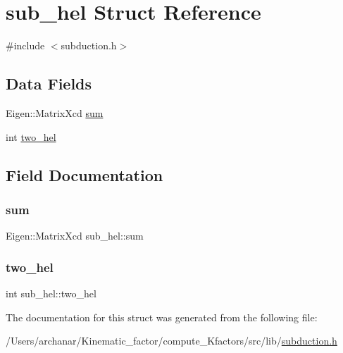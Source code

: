 \hypertarget{structsub__hel}{}\section{sub\+\_\+hel Struct Reference}
\label{structsub__hel}


{\ttfamily \#include $<$subduction.\+h$>$}

\subsection*{Data Fields}
\begin{DoxyCompactItemize}
\item 
Eigen\+::\+Matrix\+Xcd \mbox{\hyperlink{structsub__hel_ab9af10158d0adb4843c85bdf9b7517f7}{sum}}
\item 
int \mbox{\hyperlink{structsub__hel_a5169b026327848aac58eb2eec0f0cbb1}{two\+\_\+hel}}
\end{DoxyCompactItemize}


\subsection{Field Documentation}
\mbox{\label{structsub__hel_ab9af10158d0adb4843c85bdf9b7517f7}} 
\subsubsection{\texorpdfstring{sum}{sum}}
{\footnotesize\ttfamily Eigen\+::\+Matrix\+Xcd sub\+\_\+hel\+::sum}

\mbox{\label{structsub__hel_a5169b026327848aac58eb2eec0f0cbb1}} 
\subsubsection{\texorpdfstring{two\_hel}{two\_hel}}
{\footnotesize\ttfamily int sub\+\_\+hel\+::two\+\_\+hel}



The documentation for this struct was generated from the following file\+:\begin{DoxyCompactItemize}
\item 
/\+Users/archanar/\+Kinematic\+\_\+factor/compute\+\_\+\+Kfactors/src/lib/\mbox{\hyperlink{src_2lib_2subduction_8h}{subduction.\+h}}\end{DoxyCompactItemize}
